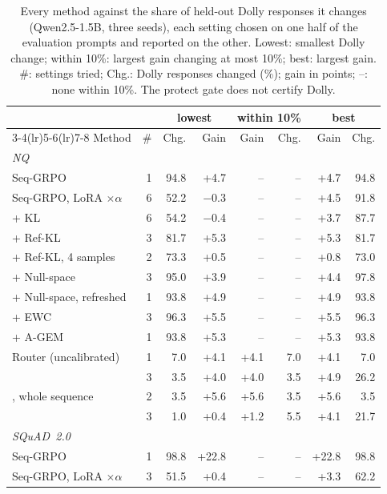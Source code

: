 \begin{table}[t]
\centering
\scriptsize
\begin{minipage}[t]{0.535\linewidth}
\centering
\setlength{\tabcolsep}{2.2pt}
\caption{Every method against the share of held-out Dolly responses it changes (Qwen2.5-1.5B, three seeds),
each setting chosen on one half of the evaluation prompts and reported on the other. Lowest: smallest Dolly change;
within 10\%: largest gain changing at most 10\%; best: largest gain. \#: settings tried; Chg.: Dolly responses
changed (\%); gain in points; --: none within 10\%. The protect gate does not certify Dolly.}
\label{tab:matched}
\begin{tabular}{l r rr rr rr}
\toprule
 & & \multicolumn{2}{c}{lowest} & \multicolumn{2}{c}{within 10\%} & \multicolumn{2}{c}{best} \\
\cmidrule(lr){3-4}\cmidrule(lr){5-6}\cmidrule(lr){7-8}
Method & \# & Chg. & Gain & Gain & Chg. & Gain & Chg. \\
\midrule
\multicolumn{8}{l}{\emph{NQ}} \\
Seq-GRPO & 1 & 94.8 & +4.7 & -- & -- & +4.7 & 94.8 \\
Seq-GRPO, LoRA $\times\alpha$ & 6 & 52.2 & $-$0.3 & -- & -- & +4.5 & 91.8 \\
+ KL & 6 & 54.2 & $-$0.4 & -- & -- & +3.7 & 87.7 \\
+ Ref-KL & 3 & 81.7 & +5.3 & -- & -- & +5.3 & 81.7 \\
+ Ref-KL, 4 samples & 2 & 73.3 & +0.5 & -- & -- & +0.8 & 73.0 \\
+ Null-space & 3 & 95.0 & +3.9 & -- & -- & +4.4 & 97.8 \\
+ Null-space, refreshed & 1 & 93.8 & +4.9 & -- & -- & +4.9 & 93.8 \\
+ EWC & 3 & 96.3 & +5.5 & -- & -- & +5.5 & 96.3 \\
+ A-GEM & 1 & 93.8 & +5.3 & -- & -- & +5.3 & 93.8 \\
Router (uncalibrated) & 1 & 7.0 & +4.1 & +4.1 & 7.0 & +4.1 & 7.0 \\
\methodp{} & 3 & 3.5 & +4.0 & +4.0 & 3.5 & +4.9 & 26.2 \\
\methodp{}, whole sequence & 2 & 3.5 & +5.6 & +5.6 & 3.5 & +5.6 & 3.5 \\
\methoda{} & 3 & 1.0 & +0.4 & +1.2 & 5.5 & +4.1 & 21.7 \\
\midrule
\multicolumn{8}{l}{\emph{SQuAD~2.0}} \\
Seq-GRPO & 1 & 98.8 & +22.8 & -- & -- & +22.8 & 98.8 \\
Seq-GRPO, LoRA $\times\alpha$ & 3 & 51.5 & +0.4 & -- & -- & +3.3 & 62.2 \\

\end{tabular}
\end{minipage}
\end{table}
